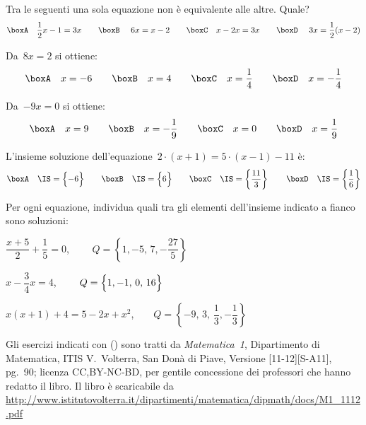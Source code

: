 \begin{esercizio}
\label{ese:13.46}
Tra le seguenti una sola equazione non è equivalente alle altre. Quale?
\[\boxA\quad \dfrac{1}{2}x-1=3x\qquad\boxB\quad~6x=x-2\qquad\boxC\quad 
x-2x=3x\qquad\boxD\quad~3x=\dfrac{1}{2}(x-2)\]
\end{esercizio}

\begin{esercizio}
\label{ese:13.47}
Da~\(8x=2\) si ottiene:
\[\boxA\quad x=-6\qquad\boxB\quad x=4\qquad\boxC\quad 
x=\dfrac{1}{4}\qquad\boxD\quad x=-{\dfrac{1}{4}}\]
\end{esercizio}

\begin{esercizio}
\label{ese:13.48}
Da~\(-9x=0\) si ottiene:
\[\boxA\quad x=9\qquad\boxB\quad x=-{\dfrac{1}{9}}\qquad\boxC\quad 
x=0\qquad\boxD\quad x=\dfrac{1}{9}\]
\end{esercizio}

\begin{esercizio}
\label{ese:13.49}
L'insieme soluzione dell'equazione~\(2\cdot \left(x+1\right)=5\cdot 
\left(x-1\right)-11\) è:
\[\boxA\quad \IS=\Bigl\{-6\Bigr\}\qquad\boxB\quad 
\IS=\Bigl\{6\Bigr\}\qquad\boxC\quad 
\IS=\left\{\dfrac{11}{3}\right\}\qquad\boxD\quad 
\IS=\left\{\dfrac{1}{6}\right\}\]
\end{esercizio}

\begin{esercizio}
\label{ese:13.50}
Per ogni equazione, individua quali tra gli elementi dell'insieme indicato a 
fianco sono soluzioni:
\begin{enumeratea}
\spazielenx
 \item \(\dfrac{x+5}{2}+\dfrac{1}{5}=0\), \(\qquad 
Q=\left\{1,-5,\,7,-\dfrac{27}{5}\right\}\)
 \item \(x-\dfrac{3}{4}x=4\), \(\qquad Q=\Bigl\{1,-1,\,0,\,16\Bigr\}\)
 \item \(x(x+1)+4=5-2x+x^{2}\),\(\qquad 
Q=\left\{-9,\,3,\,\dfrac{1}{3},-\dfrac{1}{3}\right\}\)
\end{enumeratea}
\end{esercizio}


Gli esercizi indicati con (\croce) sono tratti da \emph{Matematica~1}, 
Dipartimento di Matematica, ITIS V.~Volterra, San Donà di Piave, Versione 
[11-12][S-A11], pg.~90;
licenza CC,BY-NC-BD, per gentile concessione dei professori che hanno redatto 
il 
libro.
Il libro è scaricabile da 
\url{
http://www.istitutovolterra.it/dipartimenti/matematica/dipmath/docs/M1_1112.pdf}

